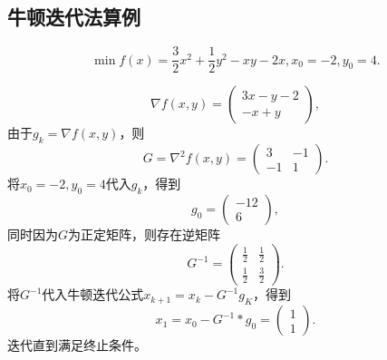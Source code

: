     
\subsection{牛顿迭代法算例}
\begin{example}
    \begin{equation}
        \min f(x)=\frac{3}{2}x^2+\frac{1}{2}y^2-xy-2x,
        x_0 = -2, y_0 = 4.
        \nonumber
    \end{equation}
\end{example}
\begin{solution}
    \begin{equation}
        \nabla f(x,y) = 
        \begin{pmatrix}
            3x-y-2 \\
            -x+y  
        \end{pmatrix},
    \nonumber
    \end{equation}
    由于$g_k=\nabla f(x,y)$，则
    \begin{equation}
    G = \nabla^2f(x,y) = 
        \begin{pmatrix}
            3 & -1\\
            -1 & 1   
        \end{pmatrix}.
    \nonumber
    \end{equation}
    将$x_0=-2,y_0=4$代入$g_k$，得到
    \begin{equation*}    
        g_0=
        \begin{pmatrix}
            -12\\
            6
        \end{pmatrix},
    \end{equation*}
    同时因为$G$为正定矩阵，则存在逆矩阵
    \begin{equation}
        G^{-1} = 
        \begin{pmatrix}
            \frac{1}{2} & \frac{1}{2} \\ 
            \frac{1}{2} & \frac{3}{2}
        \end{pmatrix}.
    \nonumber
    \end{equation}
    将$G^{-1}$代入牛顿迭代公式$x_{k+1} = x_k - G^{-1}g_K$，得到
    \begin{equation}
        x_1 = x_0 - G^{-1}*g_0 = 
        \begin{pmatrix}
            1 \\
            1
        \end{pmatrix}.
    \nonumber
    \end{equation}
    迭代直到满足终止条件。
\end{solution}


